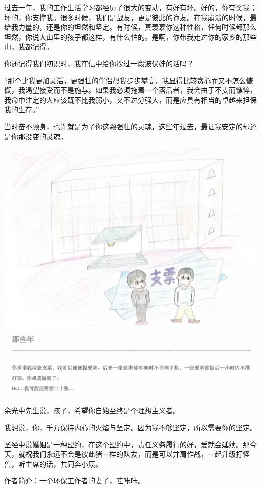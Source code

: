 \documentclass[
]{book}
\begin{document}
过去一年，我的工作生活学习都经历了很大的变动，有好有坏。好的，你夸奖我；坏的，你支撑我。很多时候，我们是战友，更是彼此的诤友。在我崩溃的时候，最给我力量的，还是你的坦然和坚定。有时候，真羡慕你这种性格，任何时候都那么坦然，你说大山里的孩子都这样，有什么怕的。是啊，你带我走过你的家乡的那些山，我都记得。

你还记得我们初识时，我在信中给你抄过一段波伏娃的话吗？

``那个比我更加灵活，更强壮的伴侣帮我步步攀高，我显得比较贪心而又不怎么慷慨，我渴望接受而不是施与。如果我必须拖着一个落后者，我会由于不支而憔悴，我命中注定的人应该既不比我弱小，又不过分强大，而是应具有相当的卓越来担保我的生存。''

当时奋不顾身，也许就是为了你这颗强壮的灵魂，这些年过去，最让我安定的却还是你那没变的灵魂。

\includegraphics[width=8.33in]{images/wife5}

余光中先生说，孩子，希望你自始至终是个理想主义者。

我想说，你，千万保持内心的火焰与坚定。因为我不够坚定，所以需要你的坚定。

圣经中说婚姻是一种盟约，在这个盟约中，责任义务履行的好，爱就会延续。那今天，就祝我们永远不会是彼此猪一样的队友，而是可以并肩作战，一起升级打怪兽，听主席的话，共同奔小康。

作者简介：一个环保工作者的妻子，哇咔咔。
\end{document}
